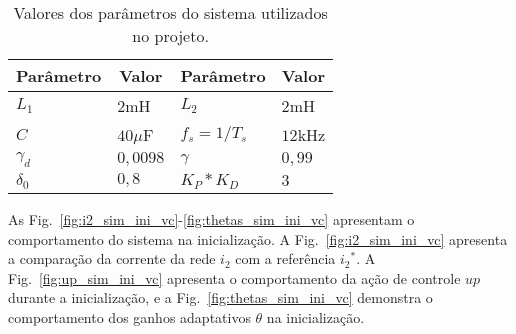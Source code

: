  \begin{table}[htb]
    \renewcommand{\arraystretch}{1.35}
    \setlength{\tabcolsep}{1.2mm}
    \caption{Valores dos parâmetros do sistema utilizados no projeto.}
    \label{tab:parametros_projeto_vc}
    \centering
    \begin{tabular}{l l l l}
      \hline
      \multicolumn{1}{c}{Parâmetro} & \multicolumn{1}{c}{Valor} &
      \multicolumn{1}{c}{Parâmetro} & \multicolumn{1}{c}{Valor} \\
      \hline
      $L_1$      & $2$mH    & $L_2$         & $2$mH   \\
      $C$        & $40\mu$F & $f_s = 1/T_s$ & $12$kHz \\
      $\gamma_d$ & $0,0098$ & $\gamma$      & $0,99$  \\
      $\delta_0$ & $0,8$    & $K_P*K_D$     & $3$     \\
      \hline
    \end{tabular}
  \end{table}

  As Fig.~\ref{fig:i2_sim_ini_vc}-\ref{fig:thetas_sim_ini_vc} apresentam o comportamento do sistema na inicialização. A Fig.~\ref{fig:i2_sim_ini_vc} apresenta a comparação da corrente da rede $i_2$ com a referência ${i_2}^*$. A Fig.~\ref{fig:up_sim_ini_vc} apresenta o comportamento da ação de controle $up$ durante a inicialização, e a Fig.~\ref{fig:thetas_sim_ini_vc} demonstra o comportamento dos ganhos adaptativos $\theta$ na inicialização.

  \noindent
  \begin{minipage}{\textwidth}
    \makebox[\textwidth]{
      \centering
      \def\svgwidth{\textwidth}
      }
    \label{fig:i2_sim_ini_vc}
  \end{minipage}

  \newpage

  \vfill
  \noindent
  \begin{minipage}{\textwidth}
    \makebox[\textwidth]{
      \centering
      \def\svgwidth{\textwidth}
      }
    \label{fig:up_sim_ini_vc}
  \end{minipage}

  \vfill
  \noindent
  \begin{minipage}{\textwidth}
    \makebox[\textwidth]{
      \centering
      \def\svgwidth{\textwidth}
      }
    \label{fig:thetas_sim_ini_vc}
  \end{minipage}
  \vfill

